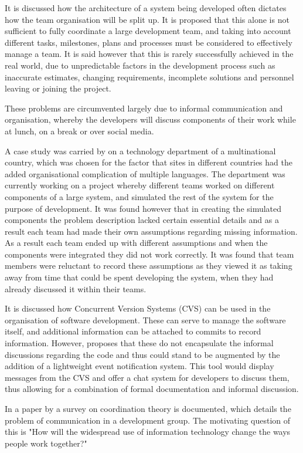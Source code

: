 \documentclass{l4proj}
\begin{document}
It is discussed how the architecture of a system being developed often dictates how the team organisation will be split up.  It is proposed that this alone is not sufficient to fully coordinate a large development team, and taking into account different tasks, milestones, plans and processes must be considered to effectively manage a team.  It is said however that this is rarely successfully achieved in the real world, due to unpredictable factors in the development process such as inaccurate estimates, changing requirements, incomplete solutions and personnel leaving or joining the project.  

These problems are circumvented largely due to informal communication and organisation, whereby the developers will discuss components of their work while at lunch, on a break or over social media.

A case study was carried by \citet{herbsleb99architectures} on a technology department of a multinational country, which was chosen for the factor that sites in different countries had the added organisational complication of multiple languages.  The department was currently working on a project whereby different teams worked on different components of a large system, and simulated the rest of the system for the purpose of development.  It was found however that in creating the simulated components the problem description lacked certain essential details and as a result each team had made their own assumptions regarding missing information.  As a result each team ended up with different assumptions and when the components were integrated they did not work correctly.  It was found that team members were reluctant to record these assumptions as they viewed it as taking away from time that could be spent developing the system, when they had already discussed it within their teams.

It is discussed how Concurrent Version Systems (CVS) can be used in the organisation of software development. These can serve to manage the software itself, and additional information can be attached to commits to record information.  However, \citet{fitzpatrick06cvs} proposes that these do not encapsulate the informal discussions regarding the code and thus could stand to be augmented by the addition of a lightweight event notification system.  This tool would display messages from the CVS and offer a chat system for developers to discuss them, thus allowing for a combination of formal documentation and informal discussion.

In a paper by \citet{malone94interdisciplinary} a survey on coordination theory is documented, which details the problem of communication in a development group.  The motivating question of this is "How will the widespread use of information technology change the ways people work together?"
\end{document}
